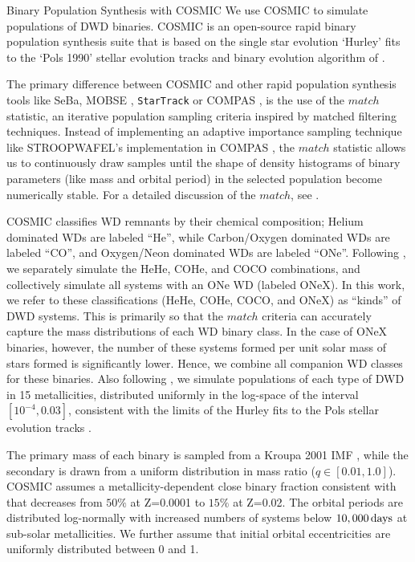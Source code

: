 \documentclass[twocolumn]{aastex631}
\begin{document}
\begin{subsection}{Binary Population Synthesis with COSMIC}
We use COSMIC \citep{Breivik2020, COSMIC_code}
    to simulate populations of DWD binaries. 
COSMIC is an open-source 
    rapid binary population synthesis suite that is based on the single star
    evolution `Hurley' fits \citep{Hurley2000} to the 
    `Pols 1990' \citep{Pols1998} stellar evolution tracks and binary evolution 
    algorithm of \citep{Hurley2002}.

The primary difference between COSMIC and other rapid 
    population synthesis tools like SeBa, \citep{PortegiesZwart1996}
    MOBSE \citep{Giacobbo2018}, 
    \texttt{StarTrack} \citep{Ruiter2010}
    or COMPAS \citep{Riley2022},
    is the use of the $match$ statistic, an iterative population 
    sampling criteria inspired by matched filtering techniques.
Instead of implementing an adaptive importance sampling technique 
    like STROOPWAFEL's implementation in COMPAS 
    \citep{2019MNRAS.490.5228B}, the $match$ statistic allows us to continuously
    draw samples until the shape of density histograms
    of binary parameters (like mass and orbital period) in the selected population
    become numerically stable.
For a detailed discussion of the $match$, see \citet{Breivik2020}.

COSMIC classifies WD remnants by their chemical composition;
    Helium dominated WDs are labeled ``He'', while
    Carbon/Oxygen dominated WDs are labeled ``CO'',
    and Oxygen/Neon dominated WDs are labeled ``ONe''.
Following \citet{Thiele2023},
    we separately simulate the HeHe, COHe, and COCO combinations,
    and collectively simulate all systems with an ONe WD (labeled ONeX).
In this work, we refer to these classifications (HeHe, COHe, COCO, and ONeX)
    as ``kinds'' of DWD systems.
This is primarily so that the $match$ criteria can accurately 
    capture the mass distributions of each WD binary class.
In the case of ONeX binaries, however, the number of these systems 
formed per unit solar mass of stars formed is significantly lower.
Hence, we combine all companion WD classes for these binaries.
Also following \citet{Thiele2023},
    we simulate populations of each type of DWD in 15 metallicities,
    distributed uniformly in the log-space of the interval $[10^{-4}, 0.03]$,
    consistent with the limits of the Hurley fits to the Pols stellar evolution tracks
    \citep{Pols1998,Hurley2000,Hurley2002}.

The primary mass of each binary is sampled from a Kroupa 2001 IMF \citep{Kroupa2003},
    while the secondary is drawn from a uniform distribution in mass ratio
    ($q \in [0.01,1.0]$).
COSMIC assumes a metallicity-dependent close binary fraction
    consistent with \citet{Moe19} that decreases from $50\%$ at Z=0.0001 to $15\%$ at Z=0.02.
The orbital periods are distributed log-normally with 
    increased numbers of systems below $10,000\,\rm{days}$ 
    at sub-solar metallicities. We further assume that initial 
    orbital eccentricities are uniformly distributed between 0 and 1.


\end{subsection}
\end{document}
